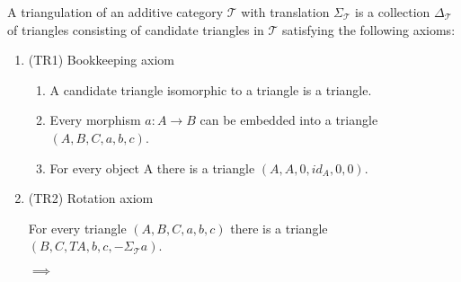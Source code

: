     \begin{definition}
        A triangulation of an additive category $\mathcal{T}$ with translation $\Sigma_{\mathcal{T}}$ is a collection $\Delta_{\mathcal{T}}$ of triangles consisting of candidate triangles in $\mathcal{T}$ satisfying the following axioms: 

        \begin{enumerate}
            \item (TR1) Bookkeeping axiom

                \begin{enumerate}
                    \item A candidate triangle isomorphic to a triangle is a triangle.
                    \item Every morphism $a : A \rightarrow B$ can be embedded into a triangle $(A,B,C,a,b,c)$.
                    \begin{center}
                    \end{center}
                    \item For every object A there is a triangle $(A,A,0,id_A,0,0)$.
                    \begin{center}
                    \end{center}
                \end{enumerate}
            \item (TR2) Rotation axiom

                For every triangle $(A,B,C,a,b,c)$ there is a triangle $(B,C,TA,b,c,-\Sigma_{\mathcal{T}}a)$.
                \begin{center}
                     $\implies$
                    

\end{center}
\end{enumerate}
\end{definition}
